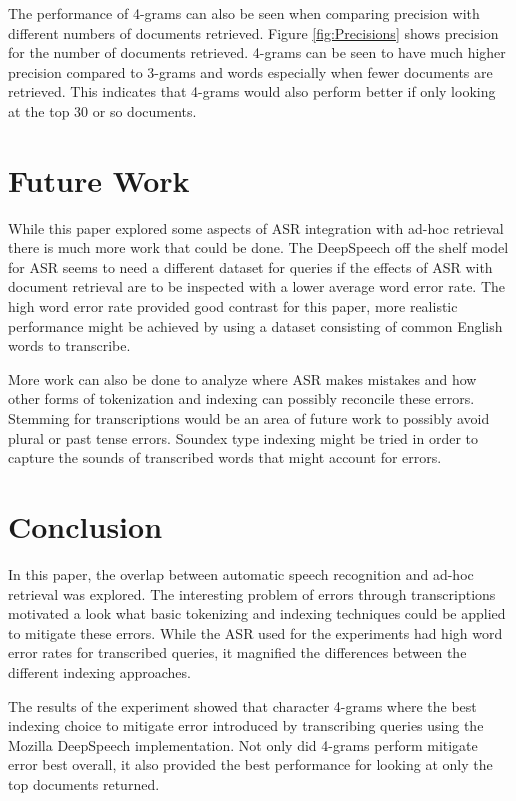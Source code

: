 \documentclass[jair, twoside,11pt,theapa]{article}
\begin{document}
The performance of 4-grams can also be seen when comparing precision with different numbers of documents retrieved. Figure \ref{fig:Precisions} shows precision for the number of documents retrieved. 4-grams can be seen to have much higher precision compared to 3-grams and words especially when fewer documents are retrieved. This indicates that 4-grams would also perform better if only looking at the top 30 or so documents. 


\section{Future Work}
\label{Future}
While this paper explored some aspects of ASR integration with ad-hoc retrieval there is much more work that could be done. The DeepSpeech off the shelf model for ASR seems to need a different dataset for queries if the effects of ASR with document retrieval are to be inspected with a lower average word error rate. The high word error rate provided good contrast for this paper, more realistic performance might be achieved by using a dataset consisting of common English words to transcribe. 

More work can also be done to analyze where ASR makes mistakes and how other forms of tokenization and indexing can possibly reconcile these errors. Stemming for transcriptions would be an area of future work to possibly avoid plural or past tense errors. Soundex type indexing might be tried in order to capture the sounds of transcribed words that might account for errors. 

\section{Conclusion}
\label{Conclusion}
In this paper, the overlap between automatic speech recognition and ad-hoc retrieval was explored. The interesting problem of errors through transcriptions motivated a look what basic tokenizing and indexing techniques could be applied to mitigate these errors. While the ASR used for the experiments had high word error rates for transcribed queries, it magnified the differences between the different indexing approaches. 

The results of the experiment showed that character 4-grams where the best indexing choice to mitigate error introduced by transcribing queries using the Mozilla DeepSpeech implementation. Not only did 4-grams perform mitigate error best overall, it also provided the best performance for looking at only the top documents returned. 
\end{document}
